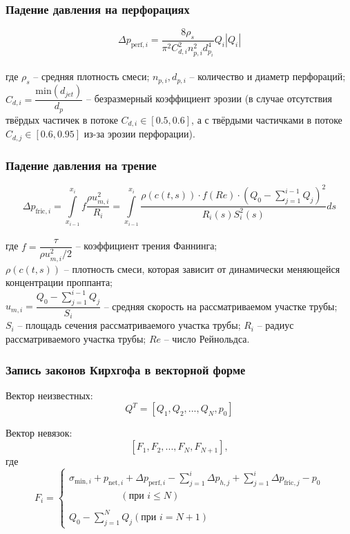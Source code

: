 \documentclass{beamer}
\begin{document}
\begin{frame}
\frametitle{Падение давления на перфорациях}
$$
\Delta p_{\text{perf},i}=\frac{8\rho_s}{\pi^2 C_{d,i}^2 n_{p,i}^2 d_{p_i}^4}Q_i\left|Q_i\right|
$$\\
где $\rho_s$ -- средняя плотность смеси;\newline
$n_{p,i}, d_{p,i}$ -- количество и диаметр перфораций;\newline\\
$C_{d,i}=\dfrac{\text{min}(d_{jet})}{d_p}$ -- безразмерный коэффициент эрозии (в случае отсутствия твёрдых частичек в потоке $C_{d,i}\in\left[0.5,0.6\right]$, а с твёрдыми частичками в потоке $C_{d,j}\in\left[0.6,0.95\right]$  из-за эрозии перфорации).

\end{frame}


\begin{frame}
\frametitle{Падение давления на трение}
\vspace*{-12mm}
$$
\Delta p_{\text{fric},i}=\int\limits_{x_{i-1}}^{x_i}{f\frac{\rho u_{m,i}^2}{R_i}}=\int\limits_{x_{i-1}}^{x_i}{\frac{\rho(c(t,s))\cdot f(Re)\cdot \left(Q_0-\sum\limits_{j=1}^{i-1}{Q_j}\right)^{\!2}}{R_i(s)S_i^2(s)}}ds
$$\\
\footnotesize
где $f=\dfrac{\tau}{\rho u_{m,i}^2/2}$ -- коэффициент трения Фаннинга;\newline\\
$\rho(c(t,s))$ -- плотность смеси, которая зависит от динамически меняющейся концентрации проппанта;\newline\\
$u_{m,i}=\dfrac{Q_0-\sum\limits_{j=1}^{i-1}{Q_j}}{S_i}$ -- средняя скорость на рассматриваемом участке трубы;\newline\\
$S_i$ -- площадь сечения рассматриваемого участка трубы;\newline
$R_i$ -- радиус рассматриваемого участка трубы;\newline
$Re$ -- число Рейнольдса.
\normalsize
\end{frame}


\begin{frame}
\frametitle{Запись законов Кирхгофа в векторной форме}

Вектор неизвестных:
$$Q^T=\left[Q_1,Q_2,...,Q_N,p_0\right]$$

Вектор невязок:
$$\left[F_1,F_2,...,F_N,F_{N+1}\right],$$
где
$$
F_i=
\begin{cases}
\sigma_{\text{min},i}+p_{\text{net},i}+\Delta p_{\text{perf},i}-\sum\limits_{j=1}^{i}{\Delta p_{h,j}}+\sum\limits_{j=1}^{i}{\Delta p_{\text{fric},j}}-p_0\\\,\,\,\,\,\,\,\,\,\,\,\,\,\,\,\,\,\,\,\,\,\,\,\,\,\,\,\,\,\,\,\,\left(\text{при }i\leqslant N\right)\\\ \\
Q_0-\sum\limits_{j=1}^{N}{Q_j}\left(\text{при }i=N+1\right)
\end{cases}
$$

\end{frame}
\end{document}
